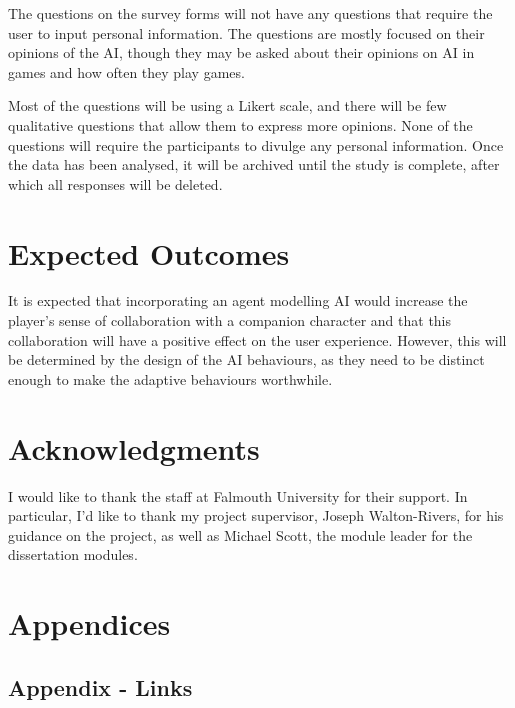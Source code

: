 \documentclass{IEEEtran}
\begin{document}
The questions on the survey forms will not have any questions that require the user to input personal information. The questions are mostly focused on their opinions of the AI, though they may be asked about their opinions on AI in games and how often they play games.

Most of the questions will be using a Likert scale, and there will be few qualitative questions that allow them to express more opinions. None of the questions will require the participants to divulge any personal information. Once the data has been analysed, it will be archived until the study is complete, after which all responses will be deleted.

\section{Expected Outcomes}
\label{ExpectedOutcomes}

It is expected that incorporating an agent modelling AI would increase the player's sense of collaboration with a companion character and that this collaboration will have a positive effect on the user experience. However, this will be determined by the design of the AI behaviours, as they need to be distinct enough to make the adaptive behaviours worthwhile.

\section*{Acknowledgments}

I would like to thank the staff at Falmouth University for their support. In particular, I'd like to thank my project supervisor, Joseph Walton-Rivers, for his guidance on the project, as well as Michael Scott, the module leader for the dissertation modules.



 

 \newpage
 
\section{Appendices}
\label{Appendices}

\subsection{Appendix - Links}
\label{AppendixLinks}
\end{document}
